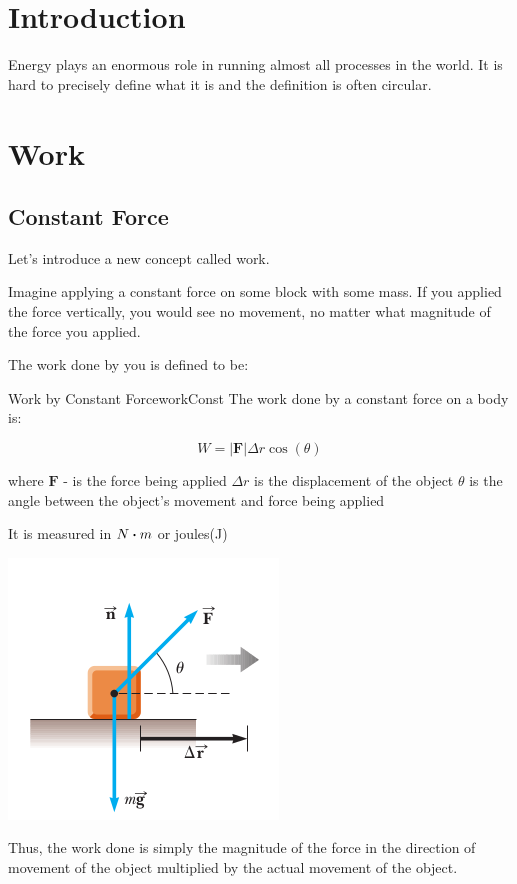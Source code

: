\documentclass{report}
\begin{document}
\section{Introduction}
Energy plays an enormous role in running almost all processes in the world. It is hard to precisely define what it is and the definition is often circular.



\section{Work}
\subsection{Constant Force}
Let's introduce a new concept called work.

Imagine applying a constant force on some block with some mass. If you applied the force vertically, you would see no movement, no matter what magnitude of the force you applied. 

The work done by you is defined to be:

\begin{mytheo}{Work by Constant Force}{workConst}
    The work done by a constant force on a body is:
    
    $$W = |\mathbf{F}|\Delta r \cos(\theta)$$
    
    where 
    $\mathbf{F}$ - is the force being applied
    $\Delta r$ is the displacement of the object
    $\theta$ is the angle between the object's movement and force being applied
    
    It is measured in $N \vdot m$ or joules(J)
\end{mytheo}

\includegraphics[scale=0.5]{work.png}


Thus, the work done is simply the magnitude of the force in the direction of movement of the object multiplied by the actual movement of the object.
\end{document}
